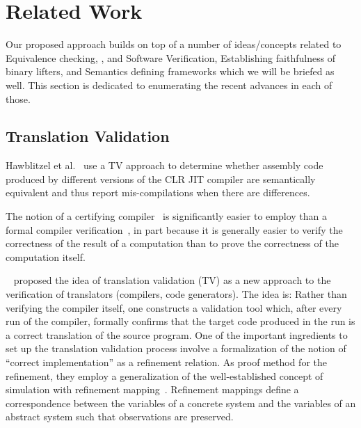 \section{Related Work}\label{sec:related-work}
Our proposed approach builds on top of a number of ideas/concepts related to
Equivalence checking, \TV, and Software Verification, Establishing faithfulness
of binary lifters, and Semantics defining frameworks which we will be briefed as well.
This section is dedicated to enumerating the recent advances in each of those.

\subsection{Translation Validation}

Hawblitzel et al.~\cite{Hawblitzel:FSE2013} use a TV approach to determine
whether assembly code produced by different versions of the CLR JIT compiler
are semantically equivalent and thus report mis-compilations when there are
differences.

The notion of a certifying
compiler~\cite{Necula:2000,Pnueli:1998,Stepp:2011,Tristan:2011} is
significantly easier to employ than a formal compiler
verification~\cite{Leroy:2009}, in part because it is generally easier to
verify the correctness of the result of a computation than to prove the
correctness of the computation itself. 

~\cite{Pnueli:1998} proposed the idea of translation validation (TV) as a new
approach to the verification of translators (compilers, code generators). The
idea is: Rather than verifying the compiler itself, one constructs a validation
tool which, after every run of the compiler, formally confirms that the target
code produced in the run is a correct translation of the source program. One of
the important ingredients  to set up the  translation validation process
involve a formalization of the notion of ``correct implementation'' as a
refinement relation. As proof method for the refinement, they employ a
generalization of the well-established concept of simulation with refinement
mapping~\cite{Abadi:1991}. Refinement mappings define a correspondence between
the variables of a concrete system and the variables of an abstract system such
that observations are preserved. 


